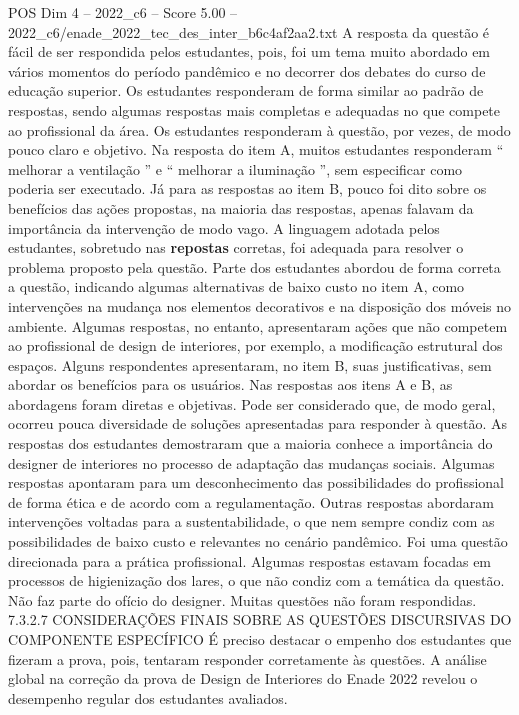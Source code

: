 \begin{textsample}{POS Dim 4 – 2022\_c6 – Score 5.00 – 2022\_c6/enade\_2022\_tec\_des\_inter\_b6c4af2aa2.txt}
A resposta da questão é fácil de ser respondida pelos estudantes, pois, foi um tema muito abordado em vários momentos do período pandêmico e no decorrer dos debates do curso de educação superior.
Os estudantes responderam de forma similar ao padrão de respostas, sendo algumas respostas mais completas e adequadas no que compete ao profissional da área.
Os estudantes responderam à questão, por vezes, de modo pouco claro e objetivo.
Na resposta do item A, muitos estudantes responderam “ melhorar a ventilação ” e “ melhorar a iluminação ”, sem especificar como poderia ser executado.
Já para as respostas ao item B, pouco foi dito sobre os benefícios das ações propostas, na maioria das respostas, apenas falavam da importância da intervenção de modo vago.
A linguagem adotada pelos estudantes, sobretudo nas \textbf{repostas} corretas, foi adequada para resolver o problema proposto pela questão.
Parte dos estudantes abordou de forma correta a questão, indicando algumas alternativas de baixo custo no item A, como intervenções na mudança nos elementos decorativos e na disposição dos móveis no ambiente.
Algumas respostas, no entanto, apresentaram ações que não competem ao profissional de design de interiores, por exemplo, a modificação estrutural dos espaços.
Alguns respondentes apresentaram, no item B, suas justificativas, sem abordar os benefícios para os usuários.
Nas respostas aos itens A e B, as abordagens foram diretas e objetivas.
Pode ser considerado que, de modo geral, ocorreu pouca diversidade de soluções apresentadas para responder à questão.
As respostas dos estudantes demostraram que a maioria conhece a importância do designer de interiores no processo de adaptação das mudanças sociais.
Algumas respostas apontaram para um desconhecimento das possibilidades do profissional de forma ética e de acordo com a regulamentação.
Outras respostas abordaram intervenções voltadas para a sustentabilidade, o que nem sempre condiz com as possibilidades de baixo custo e relevantes no cenário pandêmico.
Foi uma questão direcionada para a prática profissional.
Algumas respostas estavam focadas em processos de higienização dos lares, o que não condiz com a temática da questão.
Não faz parte do ofício do designer.
Muitas questões não foram respondidas. 7.3.2.7 CONSIDERAÇÕES FINAIS SOBRE AS QUESTÕES DISCURSIVAS DO COMPONENTE ESPECÍFICO É preciso destacar o empenho dos estudantes que fizeram a prova, pois, tentaram responder corretamente às questões.
A análise global na correção da prova de Design de Interiores do Enade 2022 revelou o desempenho regular dos estudantes avaliados.

\end{textsample}
